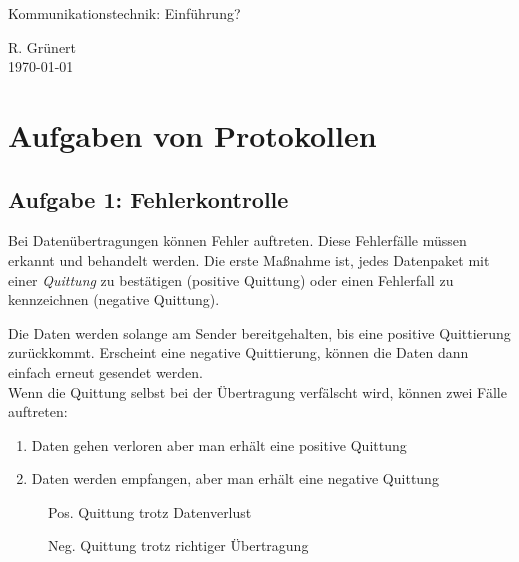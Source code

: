 \documentclass[11pt, a4paper]{article}
\begin{document}
\begin{center}
  \Large{Kommunikationstechnik: Einführung?}
\end{center}

\begin{flushright}
  R. Grünert\\
  \today
\end{flushright}

\section{Aufgaben von Protokollen}
\subsection{Aufgabe 1: Fehlerkontrolle}
Bei Datenübertragungen können Fehler auftreten. Diese Fehlerfälle müssen erkannt und behandelt werden. Die erste Maßnahme ist, jedes Datenpaket mit einer \emph{Quittung} zu bestätigen (positive Quittung) oder einen Fehlerfall zu kennzeichnen (negative Quittung).\\

\begin{figure}[H]
\centering
{}
\end{figure}

Die Daten werden solange am Sender bereitgehalten, bis eine positive Quittierung zurückkommt. Erscheint eine negative Quittierung, können die Daten dann einfach erneut gesendet werden.\\

Wenn die Quittung selbst bei der Übertragung verfälscht wird, können zwei Fälle auftreten:
\begin{enumerate}
  \item Daten gehen verloren aber man erhält eine positive Quittung
  \item Daten werden empfangen, aber man erhält eine negative Quittung
\end{enumerate}

\begin{figure}[!tbp]
  \centering
  \begin{minipage}[b]{0.4\textwidth}
    \centering
    \caption{Pos. Quittung trotz Datenverlust}
  \end{minipage}
  \hfill
  \begin{minipage}[b]{0.4\textwidth}
    \centering
    \caption{Neg. Quittung trotz richtiger Übertragung}
  \end{minipage}
\end{figure}
\end{document}
